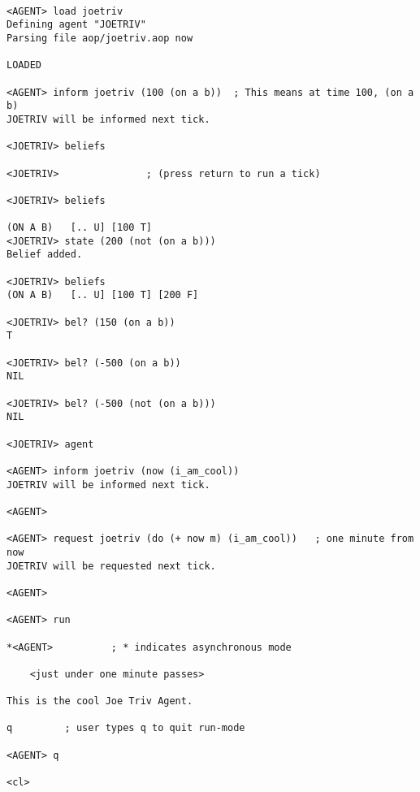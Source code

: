 \begin{verbatim}

<AGENT> load joetriv
Defining agent "JOETRIV"
Parsing file aop/joetriv.aop now

LOADED 

<AGENT> inform joetriv (100 (on a b))  ; This means at time 100, (on a b)
JOETRIV will be informed next tick.

<JOETRIV> beliefs

<JOETRIV>               ; (press return to run a tick)

<JOETRIV> beliefs

(ON A B)   [.. U] [100 T]
<JOETRIV> state (200 (not (on a b)))
Belief added.

<JOETRIV> beliefs
(ON A B)   [.. U] [100 T] [200 F]

<JOETRIV> bel? (150 (on a b))
T

<JOETRIV> bel? (-500 (on a b))
NIL

<JOETRIV> bel? (-500 (not (on a b)))
NIL

<JOETRIV> agent

<AGENT> inform joetriv (now (i_am_cool))
JOETRIV will be informed next tick.

<AGENT>

<AGENT> request joetriv (do (+ now m) (i_am_cool))   ; one minute from now
JOETRIV will be requested next tick.

<AGENT>

<AGENT> run

*<AGENT>          ; * indicates asynchronous mode

	<just under one minute passes>

This is the cool Joe Triv Agent.

q		  ; user types q to quit run-mode

<AGENT> q

<cl>

\end{verbatim}

